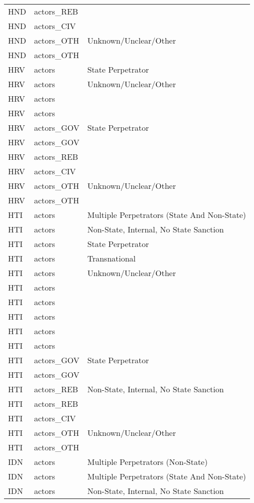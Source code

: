 \begin{table}[ht]
\begin{tabular}{lll}
  HND & actors\_REB &  \\ 
  HND & actors\_CIV &  \\ 
  HND & actors\_OTH & Unknown/Unclear/Other \\ 
  HND & actors\_OTH &  \\ 
  HRV & actors & State Perpetrator \\ 
  HRV & actors & Unknown/Unclear/Other \\ 
  HRV & actors &  \\ 
  HRV & actors &  \\ 
  HRV & actors\_GOV & State Perpetrator \\ 
  HRV & actors\_GOV &  \\ 
  HRV & actors\_REB &  \\ 
  HRV & actors\_CIV &  \\ 
  HRV & actors\_OTH & Unknown/Unclear/Other \\ 
  HRV & actors\_OTH &  \\ 
  HTI & actors & Multiple Perpetrators (State And Non-State) \\ 
  HTI & actors & Non-State, Internal, No State Sanction \\ 
  HTI & actors & State Perpetrator \\ 
  HTI & actors & Transnational \\ 
  HTI & actors & Unknown/Unclear/Other \\ 
  HTI & actors &  \\ 
  HTI & actors &  \\ 
  HTI & actors &  \\ 
  HTI & actors &  \\ 
  HTI & actors &  \\ 
  HTI & actors\_GOV & State Perpetrator \\ 
  HTI & actors\_GOV &  \\ 
  HTI & actors\_REB & Non-State, Internal, No State Sanction \\ 
  HTI & actors\_REB &  \\ 
  HTI & actors\_CIV &  \\ 
  HTI & actors\_OTH & Unknown/Unclear/Other \\ 
  HTI & actors\_OTH &  \\ 
  IDN & actors & Multiple Perpetrators (Non-State) \\ 
  IDN & actors & Multiple Perpetrators (State And Non-State) \\ 
  IDN & actors & Non-State, Internal, No State Sanction \\ 

\end{tabular}
\end{table}
